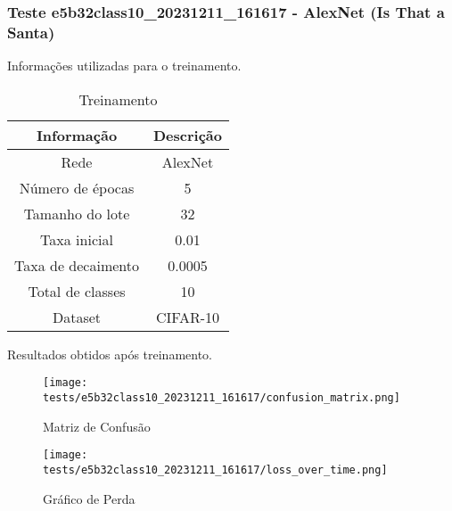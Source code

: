 \subsubsection{Teste e5b32class10_20231211_161617 - AlexNet (Is That a Santa)}

Informações utilizadas para o treinamento.

\begin{table}[ht]
   \centering
   \caption{Treinamento}
   \label{tab:modelos}
   \begin{tabular}{| c | c | }
      \hline 
      \textbf{Informação} & \textbf{Descrição} \\
      \hline \hline 
      Rede & AlexNet \\
      \hline
      Número de épocas & 5\\
      \hline
      Tamanho do lote & 32\\
      \hline
      Taxa inicial & 0.01 \\
      \hline
      Taxa de decaimento & 0.0005 \\
      \hline
      Total de classes & 10\\
      \hline
      Dataset & CIFAR-10\\
      \hline
   \end{tabular} 
\end{table}

Resultados obtidos após treinamento.


\begin{figure}[ht]
 \begin{center}
   \texttt{[image: tests/e5b32class10\_20231211\_161617/confusion\_matrix.png]}
  \caption{Matriz de Confusão}
  \label{fig:fig03}
 \end{center}
\end{figure}

\begin{figure}[ht]
 \begin{center}
   \texttt{[image: tests/e5b32class10\_20231211\_161617/loss\_over\_time.png]}
  \caption{Gráfico de Perda}
  \label{fig:fig04}
 \end{center}
\end{figure}
